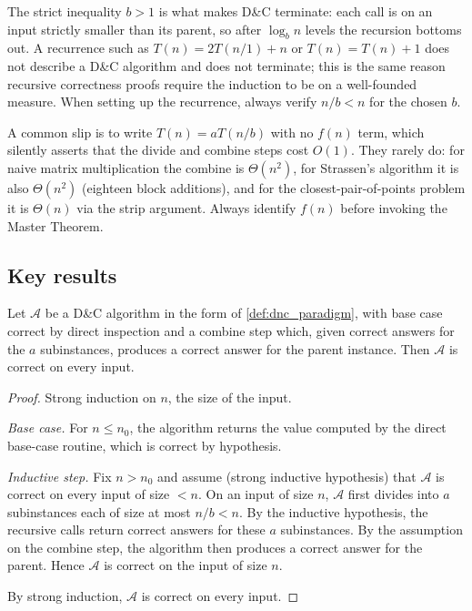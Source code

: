 \begin{remark}
The strict inequality $b > 1$ is what makes D\&C terminate: each call is on an input strictly smaller than its parent, so after $\log_b n$ levels the recursion bottoms out. A recurrence such as $T(n) = 2T(n/1) + n$ or $T(n) = T(n) + 1$ does not describe a D\&C algorithm and does not terminate; this is the same reason recursive correctness proofs require the induction to be on a well-founded measure. When setting up the recurrence, always verify $n/b < n$ for the chosen $b$.
\end{remark}

\begin{remark}
A common slip is to write $T(n) = a T(n/b)$ with no $f(n)$ term, which silently asserts that the divide and combine steps cost $O(1)$. They rarely do: for naive matrix multiplication the combine is $\Theta(n^2)$, for Strassen's algorithm it is also $\Theta(n^2)$ (eighteen block additions), and for the closest-pair-of-points problem it is $\Theta(n)$ via the strip argument. Always identify $f(n)$ before invoking the Master Theorem.
\end{remark}

\subsection{Key results}

\begin{theorem}
\label{thm:dnc_correctness}
Let $\mathcal{A}$ be a D\&C algorithm in the form of \cref{def:dnc_paradigm}, with base case correct by direct inspection and a combine step which, given correct answers for the $a$ subinstances, produces a correct answer for the parent instance. Then $\mathcal{A}$ is correct on every input.
\end{theorem}

\begin{proof}
Strong induction on $n$, the size of the input.

\smallskip
\noindent\emph{Base case.} For $n \le n_0$, the algorithm returns the value computed by the direct base-case routine, which is correct by hypothesis.

\smallskip
\noindent\emph{Inductive step.} Fix $n > n_0$ and assume (strong inductive hypothesis) that $\mathcal{A}$ is correct on every input of size $< n$. On an input of size $n$, $\mathcal{A}$ first divides into $a$ subinstances each of size at most $n/b < n$. By the inductive hypothesis, the recursive calls return correct answers for these $a$ subinstances. By the assumption on the combine step, the algorithm then produces a correct answer for the parent. Hence $\mathcal{A}$ is correct on the input of size $n$.

By strong induction, $\mathcal{A}$ is correct on every input.
\end{proof}

